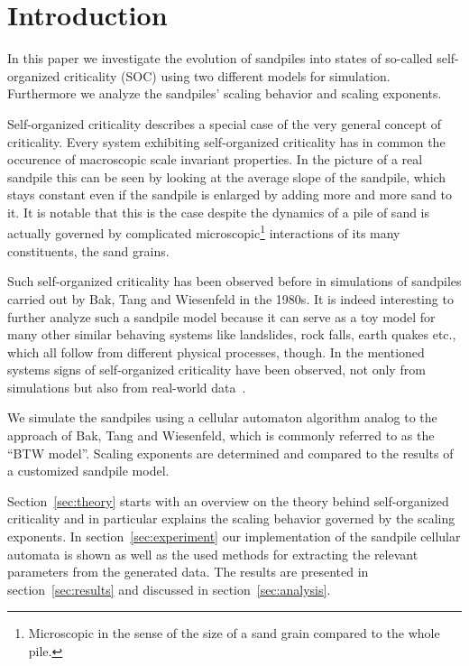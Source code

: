 \begin{abstract}
\dots
\end{abstract}

\maketitle

\section{Introduction}
\label{sec:intro}
In this paper we investigate the evolution of sandpiles into states of so-called self-organized criticality (SOC) using
two different models for simulation. Furthermore we analyze the sandpiles' scaling behavior and scaling exponents.

Self-organized criticality describes a special case of the very general concept of criticality. Every system
exhibiting self-organized criticality has in common the occurence of macroscopic scale invariant properties.
In the picture of a real sandpile this can be seen by looking at the average slope of the sandpile,
which stays constant even if the sandpile is enlarged by adding more and more sand to it.
It is notable that this is the case despite the dynamics of a pile of sand is actually governed by complicated
microscopic\footnote{Microscopic in the sense of the size of a sand grain compared to the whole pile.} interactions
of its many constituents, the sand grains.

Such self-organized criticality has been observed before in simulations of sandpiles carried out by Bak, Tang and
Wiesenfeld in the 1980s. It is indeed interesting to further analyze such a sandpile model
because it can serve as a toy model for many other similar behaving systems like landslides, rock falls, earth quakes
etc., which all follow from different physical processes, though.
In the mentioned systems signs of self-organized criticality have been observed, not only from simulations but also
from real-world data~\cite{Hergarten}.

We simulate the sandpiles using a cellular automaton algorithm analog to the approach of Bak, Tang and Wiesenfeld,
which is commonly referred to as the \enquote{BTW model}. Scaling exponents are determined and compared to the
results of a customized sandpile model.

Section~\ref{sec:theory} starts with an overview on the theory behind self-organized criticality and in particular
explains the scaling behavior governed by the scaling exponents.
In section~\ref{sec:experiment} our implementation of the sandpile cellular automata is shown as well as
the used methods for extracting the relevant parameters from the generated data.
The results are presented in section~\ref{sec:results} and discussed in section~\ref{sec:analysis}.


